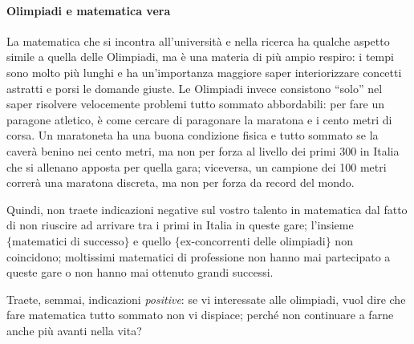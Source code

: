\documentclass[a4paper,10pt]{paper}
\begin{document}
\paragraph{Olimpiadi e matematica vera}
 La matematica che si incontra all'università e nella ricerca ha qualche aspetto simile a quella delle Olimpiadi, ma è una materia di più ampio respiro: i tempi sono molto più lunghi e ha un'importanza maggiore saper interiorizzare concetti astratti e porsi le domande giuste. Le Olimpiadi invece consistono ``solo'' nel saper risolvere velocemente problemi tutto sommato abbordabili: per fare un paragone atletico, è come cercare di paragonare la maratona e i cento metri di corsa. Un maratoneta ha una buona condizione fisica e tutto sommato se la caverà benino nei cento metri, ma non per forza al livello dei primi 300 in Italia che si allenano apposta per quella gara; viceversa, un campione dei 100 metri correrà una maratona discreta, ma non per forza da record del mondo.
 
 Quindi, non traete indicazioni negative sul vostro talento in matematica dal fatto di non riuscire ad arrivare tra i primi in Italia in queste gare; l'insieme $\{\text{matematici di successo}\}$ e quello $\{\text{ex-concorrenti delle olimpiadi}\}$ non coincidono; moltissimi matematici di professione non hanno mai partecipato a queste gare o non hanno mai ottenuto grandi successi.
 
 Traete, semmai, indicazioni \emph{positive}: se vi interessate alle olimpiadi, vuol dire che fare matematica tutto sommato non vi dispiace; perché non continuare a farne anche più avanti nella vita?
\end{document}
